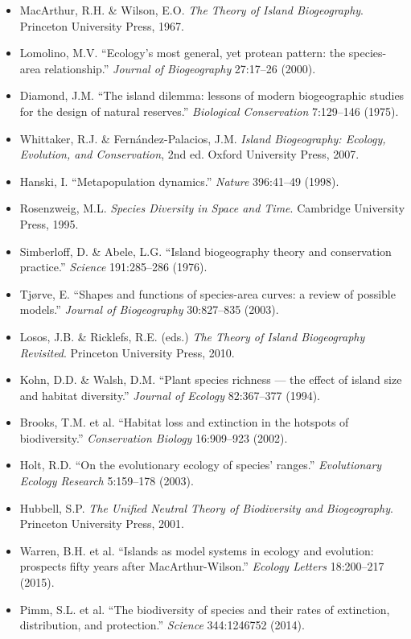 \documentclass[a4paper, 11pt]{article}
\begin{document}
\begin{itemize}
\item MacArthur, R.H. \& Wilson, E.O. \textit{The Theory of Island Biogeography}. Princeton University Press, 1967.
\item Lomolino, M.V. ``Ecology's most general, yet protean pattern: the species-area relationship.'' \textit{Journal of Biogeography} 27:17--26 (2000).
\item Diamond, J.M. ``The island dilemma: lessons of modern biogeographic studies for the design of natural reserves.'' \textit{Biological Conservation} 7:129--146 (1975).
\item Whittaker, R.J. \& Fern\'andez-Palacios, J.M. \textit{Island Biogeography: Ecology, Evolution, and Conservation}, 2nd ed. Oxford University Press, 2007.
\item Hanski, I. ``Metapopulation dynamics.'' \textit{Nature} 396:41--49 (1998).
\item Rosenzweig, M.L. \textit{Species Diversity in Space and Time}. Cambridge University Press, 1995.
\item Simberloff, D. \& Abele, L.G. ``Island biogeography theory and conservation practice.'' \textit{Science} 191:285--286 (1976).
\item Tjørve, E. ``Shapes and functions of species-area curves: a review of possible models.'' \textit{Journal of Biogeography} 30:827--835 (2003).
\item Losos, J.B. \& Ricklefs, R.E. (eds.) \textit{The Theory of Island Biogeography Revisited}. Princeton University Press, 2010.
\item Kohn, D.D. \& Walsh, D.M. ``Plant species richness --- the effect of island size and habitat diversity.'' \textit{Journal of Ecology} 82:367--377 (1994).
\item Brooks, T.M. et al. ``Habitat loss and extinction in the hotspots of biodiversity.'' \textit{Conservation Biology} 16:909--923 (2002).
\item Holt, R.D. ``On the evolutionary ecology of species' ranges.'' \textit{Evolutionary Ecology Research} 5:159--178 (2003).
\item Hubbell, S.P. \textit{The Unified Neutral Theory of Biodiversity and Biogeography}. Princeton University Press, 2001.
\item Warren, B.H. et al. ``Islands as model systems in ecology and evolution: prospects fifty years after MacArthur-Wilson.'' \textit{Ecology Letters} 18:200--217 (2015).
\item Pimm, S.L. et al. ``The biodiversity of species and their rates of extinction, distribution, and protection.'' \textit{Science} 344:1246752 (2014).

\end{itemize}
\end{document}
